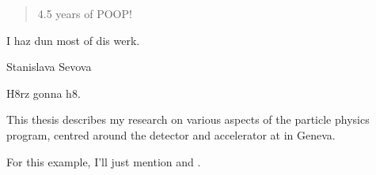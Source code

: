 

\begin{abstract}%
  4.5 years of POOP!
\end{abstract}


\begin{declaration}
        I haz dun most of dis werk.     
  \vspace*{1cm}
  \begin{flushright}
    Stanislava Sevova
  \end{flushright}
\end{declaration}


\begin{acknowledgements}
        H8rz gonna h8.
\end{acknowledgements}


\begin{preface}
        This thesis describes my research on various aspects of the \CMS particle physics program, centred around the \CMS detector and \LHC accelerator at \CERN in Geneva.

  \noindent
  For this example, I'll just mention 
  and .
\end{preface}

\tableofcontents


\thispagestyle{empty}
